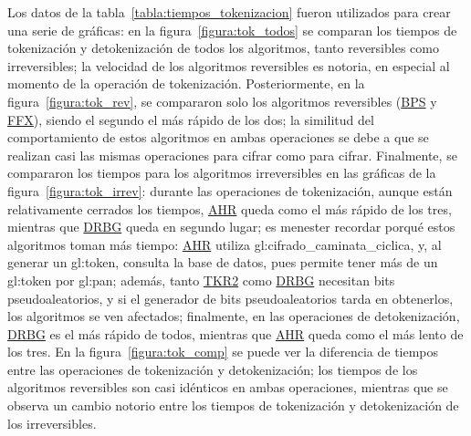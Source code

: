 Los datos de la tabla~\ref{tabla:tiempos_tokenizacion} fueron utilizados para
crear una serie de gráficas: en la figura~\ref{figura:tok_todos} se comparan los
tiempos de tokenización y detokenización de todos los algoritmos, tanto
reversibles como irreversibles; la velocidad de los algoritmos reversibles es
notoria, en especial al momento de la operación de tokenización. Posteriormente,
en la figura~\ref{figura:tok_rev}, se compararon solo los algoritmos reversibles
(\hyperref[sec:bps]{BPS} y \hyperref[sec:ffx]{FFX}), siendo el segundo el más
rápido de los dos; la similitud del comportamiento de estos algoritmos en ambas
operaciones se debe a que se realizan casi las mismas operaciones para cifrar
como para cifrar. Finalmente, se compararon los tiempos para los algoritmos
irreversibles en las gráficas de la figura~\ref{figura:tok_irrev}: durante las
operaciones de tokenización, aunque están relativamente cerrados los tiempos,
\hyperref[sec:ahr]{AHR} queda como el más rápido de los tres, mientras que
\hyperref[sec:drbg_lista]{DRBG} queda en segundo lugar; es menester recordar
porqué estos algoritmos toman más tiempo: \hyperref[sec:ahr]{AHR} utiliza
\gls{gl:cifrado_caminata_ciclica}, y, al generar un \gls{gl:token}, consulta la
base de datos, pues permite tener más de un \gls{gl:token} por \gls{gl:pan};
además, tanto \hyperref[sec:tkr]{TKR2} como \hyperref[sec:drbg_lista]{DRBG}
necesitan bits pseudoaleatorios, y si el generador de bits pseudoaleatorios
tarda en obtenerlos, los algoritmos se ven afectados; finalmente, en las
operaciones de detokenización, \hyperref[sec:drbg_lista]{DRBG} es el más rápido
de todos, mientras que \hyperref[sec:ahr]{AHR} queda como el más lento de los
tres. En la figura~\ref{figura:tok_comp} se puede ver la diferencia de tiempos
entre las operaciones de tokenización y detokenización; los tiempos de los
algoritmos reversibles son casi idénticos en ambas operaciones, mientras que
se observa un cambio notorio entre los tiempos de tokenización y detokenización
de los irreversibles.

